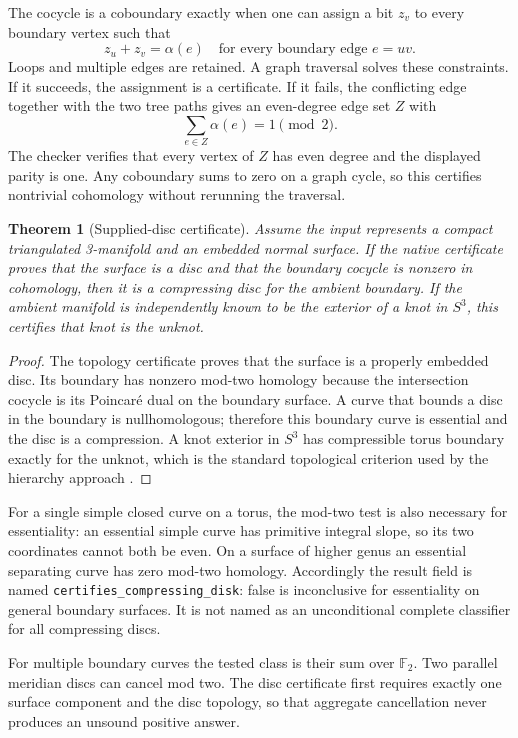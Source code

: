 \documentclass[11pt,a4paper]{article}
\newtheorem{theorem}{Theorem}[section]
\theoremstyle{definition}\newtheorem{definition}[theorem]{Definition}
\theoremstyle{remark}\newtheorem{remark}[theorem]{Remark}
\newcommand{\F}{\mathbb F_2}
\newcommand{\code}[1]{\texttt{#1}}
\begin{document}
The cocycle is a coboundary exactly when one can assign a bit $z_v$ to every
boundary vertex such that
\begin{equation}\label{eq:parity}
 z_u+z_v=\alpha(e)\quad\text{for every boundary edge }e=uv.
\end{equation}
Loops and multiple edges are retained. A graph traversal solves these
constraints. If it succeeds, the assignment is a certificate. If it fails,
the conflicting edge together with the two tree paths gives an even-degree
edge set $Z$ with
\[
 \sum_{e\in Z}\alpha(e)=1\pmod2.
\]
The checker verifies that every vertex of $Z$ has even degree and the
displayed parity is one. Any coboundary sums to zero on a graph cycle, so
this certifies nontrivial cohomology without rerunning the traversal.

\begin{theorem}[Supplied-disc certificate]\label{thm:disk}
Assume the input represents a compact triangulated 3-manifold and an
embedded normal surface. If the native certificate proves that the surface
is a disc and that the boundary cocycle is nonzero in cohomology, then it
is a compressing disc for the ambient boundary. If the ambient manifold
is independently known to be the exterior of a knot in $S^3$, this
certifies that knot is the unknot.
\end{theorem}
\begin{proof}
The topology certificate proves that the surface is a properly embedded
disc. Its boundary has nonzero mod-two homology because the intersection
cocycle is its Poincar\'e dual on the boundary surface. A curve that bounds
a disc in the boundary is nullhomologous; therefore this boundary curve is
essential and the disc is a compression. A knot exterior in $S^3$ has
compressible torus boundary exactly for the unknot, which is the standard
topological criterion used by the hierarchy approach \cite{lackenby2026}.
\end{proof}

For a single simple closed curve on a torus, the mod-two test is also
necessary for essentiality: an essential simple curve has primitive
integral slope, so its two coordinates cannot both be even. On a surface
of higher genus an essential separating curve has zero mod-two homology.
Accordingly the result field is named \code{certifies\_compressing\_disk}:
false is inconclusive for essentiality on general boundary surfaces. It is
not named as an unconditional complete classifier for all compressing discs.

For multiple boundary curves the tested class is their sum over $\F$.
Two parallel meridian discs can cancel mod two. The disc certificate first
requires exactly one surface component and the disc topology, so that
aggregate cancellation never produces an unsound positive answer.
\end{document}
